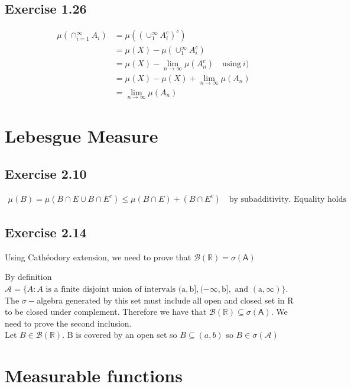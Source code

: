 \documentclass[11pt]{article}
\numberwithin{equation}{section}
\theoremstyle{plain}
\theoremstyle{definition}
\newcommand\parens[1]{\left( #1 \right)}
\def\sse{\subseteq}
\newcommand{\1}{\mathbbm 1}
\def\s{\sigma}
\newcommand{\RR}{\mathbb R}
\renewcommand{\AA}{\mathsf A}
\newcommand{\bB}{\mathcal B}
\begin{document}
\subsection*{Exercise 1.26}
	\begin{align*}
	\mu (\cap^\infty_{i=1} A_i) &= \mu \parens{\parens{\cup^\infty_1 A^c_i}^c} \\
						   &=  \mu (X) - \mu \parens{\cup^\infty_1 A^c_i}\\
						   &= \mu (X) - \lim_{n \to \infty} \mu \parens{A^c_n} \quad \text{using} \ i) \\
						   &= \mu (X) - \mu (X) +\lim_{n \to \infty} \mu \parens{A_n} \\
						   &=  \lim_{n \to \infty} \mu \parens{A_n}
	\end{align*}


\section*{Lebesgue Measure}
\subsection*{Exercise 2.10}
\begin{align}
\mu \parens{B} = \mu \parens{B \cap E \cup B \cap E^c} \leq \mu \parens{B \cap E} + \parens{B \cap E^c} \quad \text{by subadditivity. Equality holds}
\end{align}

\subsection*{Exercise 2.14}

Using Cathéodory extension, we need to prove that $\bB (\RR) = \s (\AA)$

By definition $ \mathcal{A}=\{A : A \text { is a finite disjoint union of intervals } (\mathrm{a}, \mathrm{b}],(-\infty, \mathrm{b}], \text { and }(\mathrm{a}, \infty) \}$. The $\s-$algebra generated by this set must include all open and closed set in R to be closed under complement. Therefore we have that $\bB (\RR) \sse \s (\AA)$. We need to prove the second inclusion. \\
Let $B \in \bB (\RR)$. B is covered by an open set so $B \sse (a,b)$ so $B \in \s(\mathcal{A})$

\section*{Measurable functions}
\end{document}
